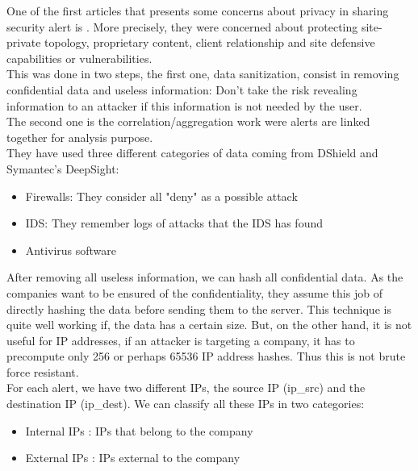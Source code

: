 \documentclass{eplmastersthesis}
\begin{document}
One of the first articles that presents some concerns about privacy in sharing security alert is \cite{lincoln2004privacy}.
More precisely, they were concerned about protecting site-private topology, proprietary content, client relationship and site defensive capabilities or vulnerabilities.\\
This was done in two steps, the first one, data sanitization, consist in removing confidential data and useless information: Don't take the risk revealing information to an attacker if this information is not needed by the user.\\
The second one is the correlation/aggregation work were alerts are linked together for analysis purpose.\\
 They have used three different categories of data coming from DShield and Symantec's DeepSight:
\begin{itemize}
\item Firewalls: They consider all "deny" as a possible attack
\item IDS: They remember logs of attacks that the IDS has found
\item Antivirus software
\end{itemize}

After removing all useless information, we can hash all confidential data. As the companies want to be ensured of the confidentiality, they assume this job of directly hashing the data before sending them to the server.
This technique is quite well working if, the data has a certain size. But, on the other hand, it is not useful for IP addresses, if an attacker is targeting a company, it has to precompute only 256 or perhaps 65536 IP address hashes. Thus this is not brute force resistant.\\
For each alert, we have two different IPs, the source IP (ip\_src) and the destination IP (ip\_dest). We can classify all these IPs in two categories:
\begin{itemize}
	\item Internal IPs : IPs that belong to the company
	\item External IPs : IPs external to the company
\end{itemize}
\end{document}
